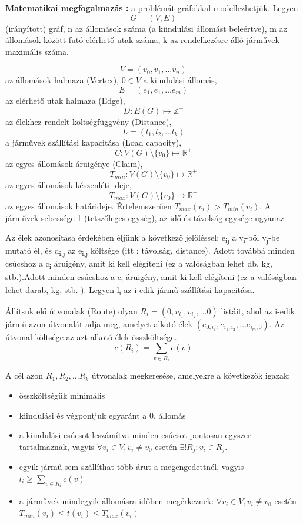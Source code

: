\textbf{Matematikai megfogalmazás :} a problémát gráfokkal modellezhetjük.
\newline 
Legyen \[ G = (V,E) \] (irányított) gráf, n az állomások száma (a kiindulási állomást beleértve), m az állomások között futó elérhető utak száma, k az rendelkezésre álló járművek maximális száma.

\[ V = (v_0,v_1, \dots v_n )\] az állomások halmaza (Vertex), \(0 \in V\) a kiindulási állomás,
\[ E = (e_1,e_1, \dots e_m)\] az elérhető utak halmaza (Edge),
\[ D : E(G) \mapsto \mathbb{Z}^+\] az élekhez rendelt költségfüggvény (Distance),
\[ L = (l_1,l_2, \dots l_k)\] a járművek szállítási kapacitása (Load capacity),
\[ C : V(G)\setminus \{v_0\} \mapsto \mathbb{R}^+ \] az egyes állomások áruigénye (Claim),
\[ T_{min} :  V(G)\setminus \{v_0\} \mapsto \mathbb{R}^+ \] az egyes állomások készenléti ideje,
\[ T_{max} :  V(G)\setminus \{v_0\} \mapsto \mathbb{R}^+ \] az egyes állomások határideje. Értelemszerűen \(T_{max}(v_i) > T_{min}(v_i) \). A járművek sebessége 1 (tetszőleges egység), az idő és távolság egysége ugyanaz.

Az élek azonosítása érdekében éljünk a következő jelöléssel: e\textsubscript{ij} a v\textsubscript{i}-ből v\textsubscript{j}-be mutató él, és d\textsubscript{i,j} az e\textsubscript{i,j} költsége (itt : távolság, distance). Adott továbbá minden csúcshoz a c\textsubscript{i} áruigény, amit ki kell elégíteni (ez a valóságban lehet db, kg, stb.).Adott minden csúcshoz a c\textsubscript{i} áruigény, amit ki kell elégíteni (ez a valóságban lehet darab, kg, stb. ).  Legyen l\textsubscript{i} az i-edik jármű szállítási kapacitása.

Állítsuk elő útvonalak (Route) olyan \( R_{i} = (0, v_{i_1}, v_{i_2}, \dots 0) \) listáit,
ahol az i-edik jármű azon útvonalát adja meg, amelyet alkotó élek 
\( (e_{0,i_{1}}, e_{i_{1},i_{2}}, \dots e_{i_{m},0}) \). Az útvonal költsége az azt alkotó élek összköltsége. 
\begin{equation}
	c(R_i) = \sum_{v \in R_i} c(v)
\end{equation}


A cél azon \(R_1,R_2,...R_k \) útvonalak megkeresése, amelyekre a következők igazak:
\begin{itemize}
	\item összköltségük minimális
	\item kiindulási és végpontjuk egyaránt a 0. állomás
	\item a kiindulási csúcsot leszámítva minden csúcsot pontosan egyszer tartalmaznak, vagyis \(\forall v_i \in V, v_i\ne v_0\) esetén \( \exists!R_j : v_i \in R_j \). 
	\item egyik jármű sem szállíthat több árut a megengedettnél, vagyis \(l_i \geqslant \sum_{v \in R_i} c(v) \)
	\item a járművek mindegyik állomásra időben megérkeznek: \(\forall v_i \in V, v_i\ne v_0\) esetén \( T_{min}(v_i) \leqslant t(v_i) \leqslant T_{max}(v_i) \)
\end{itemize}

